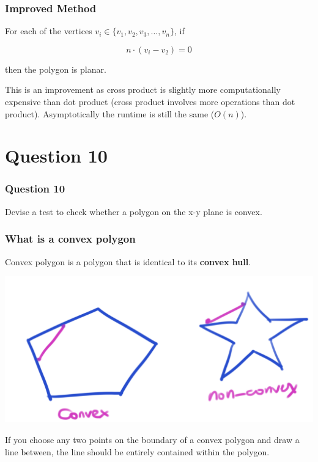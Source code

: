 \documentclass{beamer}
\begin{document}
\begin{frame}
    \frametitle{Improved Method}

    For each of the vertices $v_i \in \{v_1, v_2, v_3, \dots, v_n\}$, if 

    $$
    n \cdot (v_i - v_2) = 0
    $$

    then the polygon is planar.

    \begin{tcolorbox}
        This is an improvement as cross product is slightly more computationally expensive than dot product
        (cross product involves more operations than dot product). Asymptotically the runtime is still the same ($O(n)$).
    \end{tcolorbox}

\end{frame}

\section{Question 10}

\begin{frame}
    \frametitle{Question 10}

    Devise a test to check whether a polygon on the x-y plane is convex.
\end{frame}

\begin{frame}
    \frametitle{What is a convex polygon}

    Convex polygon is a polygon that is identical to its \textbf{convex hull}.\\

    \begin{center}
        \includegraphics[scale=0.3]{convex-def.png}
    \end{center}

    If you choose any two points on the boundary of a convex polygon and draw a line between, 
    the line should be entirely contained within the polygon.

\end{frame}
\end{document}
